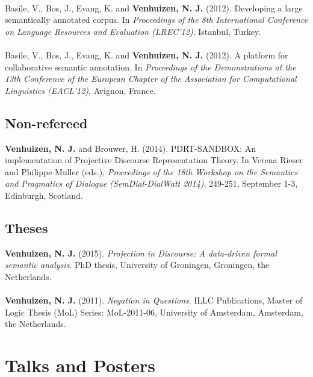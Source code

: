 \documentclass[a4paper,10pt]{article}
\begin{document}
    \\
    Basile, V., Bos, J., Evang, K. and \textbf{Venhuizen, N. J.} (2012). Developing
    a large semantically annotated corpus. In \textit{Proceedings of the 8th
    International Conference on Language Resources and Evaluation (LREC'12)},
    Istanbul, Turkey.\\
    \\
    Basile, V., Bos, J., Evang, K. and \textbf{Venhuizen, N. J.} (2012). A platform
    for collaborative semantic annotation. In \textit{Proceedings of the
    Demonstrations at the 13th Conference of the European Chapter of the
    Association for Computational Linguistics (EACL'12)}, Avignon, France.

\subsection*{Non-refereed}

\noindent
    \textbf{Venhuizen, N. J.} and Brouwer, H. (2014). PDRT-SANDBOX: An
    implementation of Projective Discourse Representation Theory. In Verena
    Rieser and Philippe Muller (eds.), \textit{Proceedings of the 18th
    Workshop on the Semantics and Pragmatics of Dialogue (SemDial-DialWatt
    2014)}, 249-251, September 1-3, Edinburgh, Scotland.

\subsection*{Theses}

\noindent
    \textbf{Venhuizen, N. J.} (2015). \textit{Projection in Discourse:
      A data-driven formal semantic analysis}. PhD thesis, University of
      Groningen, Groningen, the Netherlands.\\
    \\
    \textbf{Venhuizen, N. J.} (2011). \textit{Negation in Questions}.
      ILLC Publications, Master of Logic Thesis (MoL) Series: MoL-2011-06,
      University of Amsterdam, Amsterdam, the Netherlands.


\section*{Talks and Posters}
\end{document}
